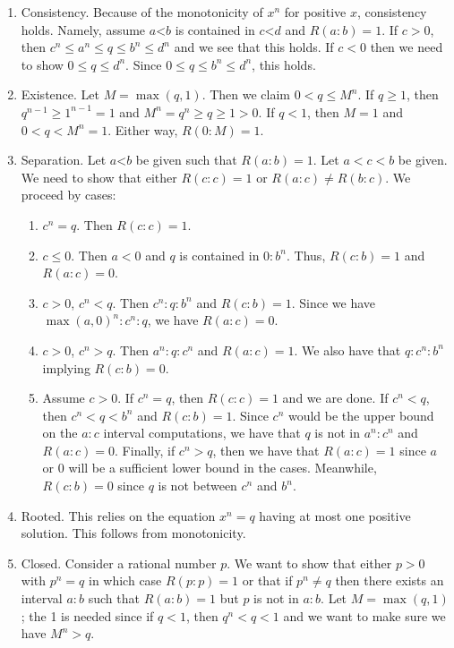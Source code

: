 \documentclass[12pt]{article}
\theoremstyle{remark}
\newcommand{\lt}{\mathord{<}}
\begin{document}
\begin{enumerate}
    \item Consistency. Because of the monotonicity of $x^n$ for positive $x$, consistency holds. Namely, assume $a\lt b$ is contained in $c \lt d$ and $R(a:b)=1$. If $c>0$, then $c^n \leq a^n \leq q \leq b^n \leq d^n$ and we see that this holds. If $c<0$ then we need to show $0 \leq q \leq d^n$. Since $0 \leq q \leq  b^n \leq d^n$, this holds. 
    \item Existence. Let $M = \max(q, 1)$. Then we claim $0 < q \leq M^n$. If $q \geq 1$, then $q^{n-1} \geq 1^{n-1} = 1$ and $M^n = q^n \geq q \geq 1 > 0$. If $ q < 1$, then $M=1$ and $0 < q < M^n = 1$. Either way, $R(0:M) = 1$. 
    \item Separation. Let $a\lt b$ be given such that $R(a:b)=1$. Let $a < c <b$ be given. We need to show that either $R(c:c) = 1$ or $R(a:c) \neq R(b:c)$. We proceed by cases:
    \begin{enumerate}
        \item $c^n = q$. Then $R(c:c) =1$.
        \item $c \leq 0$. Then $a<0$ and $q$ is contained in $0:b^n$. Thus, $R(c:b) = 1$ and $R(a:c) = 0$. 
        \item $c>0$, $c^n <q$. Then $c^n:q:b^n$ and $R(c:b)=1$. Since we have $\max(a, 0)^n :c^n:q$, we have $R(a:c)=0$. 
        \item $c>0$, $c^n > q$. Then $a^n:q:c^n$ and $R(a:c) = 1$. We also have that $q:c^n:b^n$ implying $R(c:b)=0$.
        \item Assume $c>0$. If $c^n = q$, then $R(c:c)=1$ and we are done. If $c^n < q$, then $c^n < q< b^n$ and $R(c:b)=1$. Since $c^n$ would be the upper bound on the $a:c$ interval computations, we have that $q$ is not in $a^n:c^n$ and $R(a:c)=0$. Finally, if $c^n > q$, then we have that $R(a:c)=1$ since $a$ or $0$ will be a sufficient lower bound in the cases. Meanwhile, $R(c:b) = 0$ since $q$ is not between $c^n$ and $b^n$. 
    \end{enumerate}
     \item Rooted. This relies on the equation $x^n = q$ having at most one positive solution. This follows from monotonicity. 
    \item Closed. Consider a rational number $p$. We want to show that either $p>0$ with $p^n = q$ in which case $R(p:p)=1$ or that if $p^n \neq q$ then there exists an interval $a:b$ such that $R(a:b)=1$ but $p$ is not in $a:b$. Let $M = \max(q, 1)$; the 1 is needed since if $q<1$, then $q^n < q < 1$ and we want to make sure we have $M^n > q$.
    

\end{enumerate}
\end{document}
